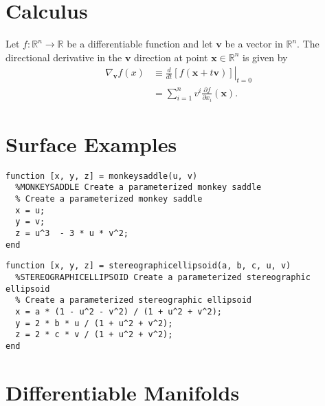 \documentclass{book}
\begin{document}
	\chapter{Calculus}
		Let $f:\mathbb{R}^n\rightarrow\mathbb{R}$ be a differentiable function and let $\mathbf{v}$ be a vector in $\mathbb{R}^n$. The directional derivative in the $\mathbf{v}$ direction at point $\mathbf{x}\in\mathbb{R}^n$ is given by
		\begin{align}
			\nabla_\mathbf{v}f(x)&\equiv\left.\frac{d}{dt}[f(\mathbf{x}+t\mathbf{v})]\right\rvert_{t=0}\\
			&=\sum_{i=1}^{n}{v^i\frac{\partial f}{\partial x_i}(\mathbf{x})}\mathrm{.}
		\end{align}
		
	\chapter{Surface Examples}
	
\begin{small}
\begin{verbatim}
function [x, y, z] = monkeysaddle(u, v)
  %MONKEYSADDLE Create a parameterized monkey saddle
  % Create a parameterized monkey saddle
  x = u;
  y = v;
  z = u^3  - 3 * u * v^2;
end		
\end{verbatim}		
\end{small}

\begin{small}
\begin{verbatim}
function [x, y, z] = stereographicellipsoid(a, b, c, u, v)
  %STEREOGRAPHICELLIPSOID Create a parameterized stereographic ellipsoid
  % Create a parameterized stereographic ellipsoid
  x = a * (1 - u^2 - v^2) / (1 + u^2 + v^2);
  y = 2 * b * u / (1 + u^2 + v^2);
  z = 2 * c * v / (1 + u^2 + v^2);
end	
\end{verbatim}		
\end{small}
		
	\chapter{Differentiable Manifolds}
	
\end{document}
